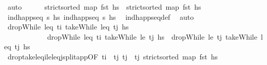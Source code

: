 \begin{isabellebody}
\ auto\isanewline
\ \ \ \ \isamarkupfalse%
\ {\isachardoublequoteopen}strict{\isacharunderscore}{\kern0pt}sorted\ {\isacharparenleft}{\kern0pt}map\ fst\ hs\ \ {\isachardoublequoteopen}strict{\isacharunderscore}{\kern0pt}sorted\ {\isacharparenleft}{\kern0pt}map\ fst\ hs\isanewline
\ \ \ \ \ \ \isamarkupfalse%
\ {\isacartoucheopen}ind{\isacharunderscore}{\kern0pt}happ{\isacharunderscore}{\kern0pt}seq\ {\isasympi}s\ hs\ {\isacartoucheopen}ind{\isacharunderscore}{\kern0pt}happ{\isacharunderscore}{\kern0pt}seq\ {\isasympi}s\ hs\ \isamarkupfalse%
\ ind{\isacharunderscore}{\kern0pt}happ{\isacharunderscore}{\kern0pt}seq{\isacharunderscore}{\kern0pt}def\ \isamarkupfalse%
\ auto\isanewline
\ \ \ \ \isamarkupfalse%
\ {\isachardoublequoteopen}dropWhile\ {\isacharparenleft}{\kern0pt}leq\ t\isactrlsub i{\isacharparenright}{\kern0pt}\ {\isacharparenleft}{\kern0pt}takeWhile\ {\isacharparenleft}{\kern0pt}leq\ t\isactrlsub j{\isacharparenright}{\kern0pt}\ hs\ \isanewline
\ \ \ \ \ \ \ \ \ \ \ {\isacharequal}{\kern0pt}\ dropWhile\ {\isacharparenleft}{\kern0pt}leq\ t\isactrlsub i{\isacharparenright}{\kern0pt}\ {\isacharparenleft}{\kern0pt}takeWhile\ {\isacharparenleft}{\kern0pt}le\ t\isactrlsub j{\isacharparenright}{\kern0pt}\ hs\ {\isacharat}{\kern0pt}\ dropWhile\ {\isacharparenleft}{\kern0pt}le\ t\isactrlsub j{\isacharparenright}{\kern0pt}\ {\isacharparenleft}{\kern0pt}takeWhile\ {\isacharparenleft}{\kern0pt}leq\ t\isactrlsub j{\isacharparenright}{\kern0pt}\ hs\isanewline
\ \ \ \ \ \ \isamarkupfalse%
\ drop{\isacharunderscore}{\kern0pt}take{\isacharunderscore}{\kern0pt}leq\isactrlsub i{\isacharunderscore}{\kern0pt}le{\isacharunderscore}{\kern0pt}leq\isactrlsub j{\isacharunderscore}{\kern0pt}split{\isacharunderscore}{\kern0pt}app{\isacharbrackleft}{\kern0pt}OF\ {\isacartoucheopen}t\isactrlsub i\ {\isacharless}{\kern0pt}\ t\isactrlsub j{\isacartoucheclose}\ {\isacartoucheopen}t\isactrlsub j\ {\isasymle}\ t\isactrlsub j{\isacartoucheclose}\ {\isacartoucheopen}strict{\isacharunderscore}{\kern0pt}sorted\ {\isacharparenleft}{\kern0pt}map\ fst\ hs\ \isanewline

\end{isabellebody}
